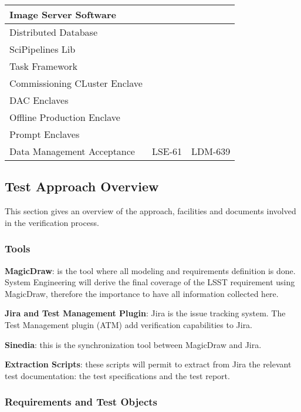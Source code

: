 {\begin{longtable}[]{p{5cm}|p{3cm}|p{3cm}}
Image Server Software & & \\\hline
Distributed Database & & \\\hline
SciPipelines Lib & & \\\hline
Task Framework & & \\\hline
Commissioning CLuster Enclave & & \\\hline
DAC Enclaves & & \\\hline
Offline Production Enclave & & \\\hline
Prompt Enclaves & & \\\hline
Data Management Acceptance & \cellcolor{ballblue} LSE-61 & \cellcolor{pastelorange} LDM-639 \\\hline
\end{longtable}
}

\subsection{Test Approach Overview}\label{sect:tsform}

This section gives an overview of the approach, facilities and documents involved in the verification process.

\subsubsection{Tools}

{\bf MagicDraw}: is the tool where all modeling and requirements definition is done. System Engineering will derive the final coverage of the LSST requirement using MagicDraw, therefore the importance to have all information collected here.

{\bf Jira and Test Management Plugin}: Jira is the issue tracking system. The Test Management plugin (ATM) add verification capabilities to Jira.

{\bf Sinedia}: this is the synchronization tool between MagicDraw and Jira.

{\bf Extraction Scripts}: these scripts will permit to extract from Jira the relevant test documentation: the test specifications and the test report.


\subsubsection{Requirements and Test Objects}


